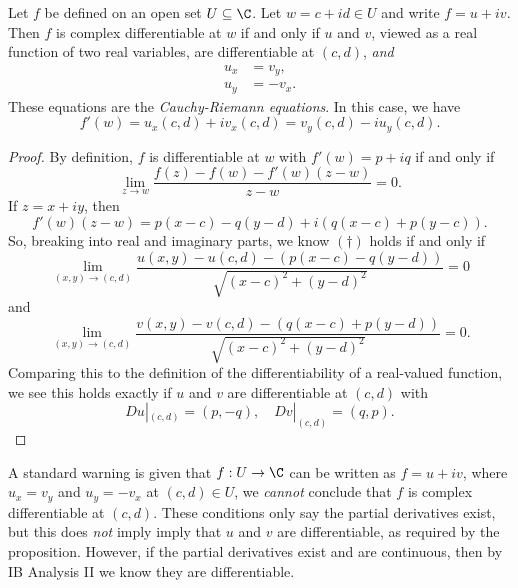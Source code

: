 \documentclass[a4paper]{article}
\begin{document}
\begin{prop}
  Let $f$ be defined on an open set $U \subseteq \C$. Let $w = c + id \in U$ and write $f = u + iv$. Then $f$ is complex differentiable at $w$ if and only if $u$ and $v$, viewed as a real function of two real variables, are differentiable at $(c, d)$, \emph{and}
  \begin{align*}
    u_x &= v_y,\\
    u_y &= -v_x.
  \end{align*}
  These equations are the \emph{Cauchy-Riemann equations}. In this case, we have
  \[
    f'(w) = u_x(c, d) + iv_x(c, d) = v_y(c, d) -i u_y(c, d).
  \]
\end{prop}

\begin{proof}
  By definition, $f$ is differentiable at $w$ with $f'(w) = p + iq$ if and only if
  \[
    \lim_{z \to w} \frac{f(z) - f(w) - f'(w)(z - w)}{z - w} = 0. \tag{$\dagger$}
  \]
  If $z = x + iy$, then
  \[
    f'(w) (z - w) = p(x - c) - q(y - d) + i(q(x - c) + p (y - c)).
  \]
  So, breaking into real and imaginary parts, we know $(\dagger)$ holds if and only if
  \[
    \lim_{(x, y) \to (c, d)} \frac{u(x, y) - u(c, d) - (p(x - c) - q(y - d))}{\sqrt{(x - c)^2 + (y - d)^2}} = 0
  \]
  and
  \[
    \lim_{(x, y) \to (c, d)} \frac{v(x, y) - v(c, d) - (q(x - c) + p(y - d))}{\sqrt{(x - c)^2 + (y - d)^2}} = 0.
  \]
  Comparing this to the definition of the differentiability of a real-valued function, we see this holds exactly if $u$ and $v$ are differentiable at $(c, d)$ with
  \[
    Du|_{(c, d)} = (p, -q),\quad Dv|_{(c, d)} = (q, p).
  \]
\end{proof}
A standard warning is given that $f: U \to \C$ can be written as $f = u + iv$, where $u_x = v_y$ and $u_y = -v_x$ at $(c, d) \in U$, we \emph{cannot} conclude that $f$ is complex differentiable at $(c, d)$. These conditions only say the partial derivatives exist, but this does \emph{not} imply imply that $u$ and $v$ are differentiable, as required by the proposition. However, if the partial derivatives exist and are continuous, then by IB Analysis II we know they are differentiable.
\end{document}
